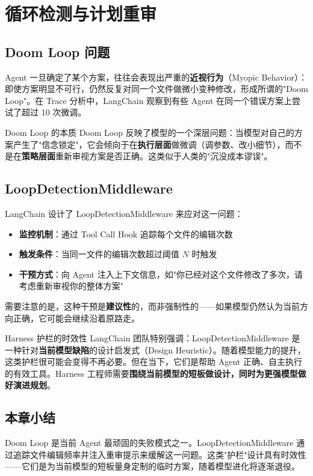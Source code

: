 \section{循环检测与计划重审}

\subsection{Doom Loop 问题}

Agent 一旦确定了某个方案，往往会表现出严重的\textbf{近视行为}（Myopic Behavior）：即使方案明显不可行，仍然反复对同一个文件做微小变种修改，形成所谓的"Doom Loop"。在 Trace 分析中，LangChain 观察到有些 Agent 在同一个错误方案上尝试了超过 10 次微调。

\begin{warningbox}{Doom Loop 的本质}
Doom Loop 反映了模型的一个深层问题：当模型对自己的方案产生了"信念锁定"，它会倾向于在\textbf{执行层面}做微调（调参数、改小细节），而不是在\textbf{策略层面}重新审视方案是否正确。这类似于人类的"沉没成本谬误"。
\end{warningbox}

\subsection{LoopDetectionMiddleware}

LangChain 设计了 LoopDetectionMiddleware 来应对这一问题：

\begin{itemize}[leftmargin=1.5em]
    \item \textbf{监控机制}：通过 Tool Call Hook 追踪每个文件的编辑次数
    \item \textbf{触发条件}：当同一文件的编辑次数超过阈值 $N$ 时触发
    \item \textbf{干预方式}：向 Agent 注入上下文信息，如"你已经对这个文件修改了多次，请考虑重新审视你的整体方案"
\end{itemize}

需要注意的是，这种干预是\textbf{建议性}的，而非强制性的——如果模型仍然认为当前方向正确，它可能会继续沿着原路走。

\begin{knowledgebox}{Harness 护栏的时效性}
LangChain 团队特别强调：LoopDetectionMiddleware 是一种针对\textbf{当前模型缺陷}的设计启发式（Design Heuristic）。随着模型能力的提升，这类护栏很可能会变得不再必要。但在当下，它们是帮助 Agent 正确、自主执行的有效工具。Harness 工程师需要\textbf{围绕当前模型的短板做设计，同时为更强模型做好演进规划}。
\end{knowledgebox}

\subsection{本章小结}

Doom Loop 是当前 Agent 最顽固的失败模式之一。LoopDetectionMiddleware 通过追踪文件编辑频率并注入重审提示来缓解这一问题。这类"护栏"设计具有时效性——它们是为当前模型的短板量身定制的临时方案，随着模型进化将逐渐退役。


